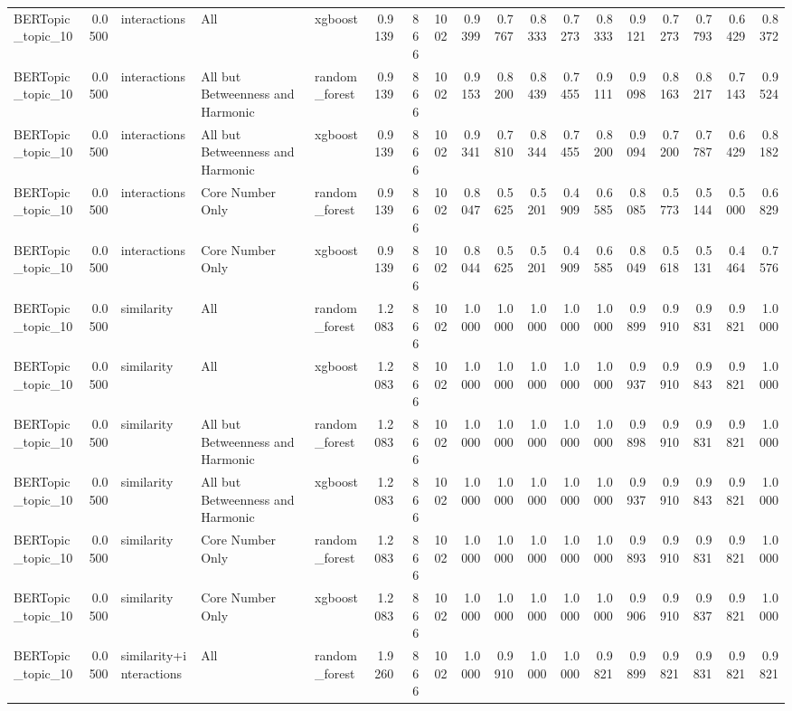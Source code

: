 \begin{tabular}{lrlllrrrrrrrrrrrrr}
BERTopic_topic_10 & 0.0500 & interactions & All & xgboost & 0.9139 & 866 & 1002 & 0.9399 & 0.7767 & 0.8333 & 0.7273 & 0.8333 & 0.9121 & 0.7273 & 0.7793 & 0.6429 & 0.8372 \\
BERTopic_topic_10 & 0.0500 & interactions & All but Betweenness and Harmonic & random_forest & 0.9139 & 866 & 1002 & 0.9153 & 0.8200 & 0.8439 & 0.7455 & 0.9111 & 0.9098 & 0.8163 & 0.8217 & 0.7143 & 0.9524 \\
BERTopic_topic_10 & 0.0500 & interactions & All but Betweenness and Harmonic & xgboost & 0.9139 & 866 & 1002 & 0.9341 & 0.7810 & 0.8344 & 0.7455 & 0.8200 & 0.9094 & 0.7200 & 0.7787 & 0.6429 & 0.8182 \\
BERTopic_topic_10 & 0.0500 & interactions & Core Number Only & random_forest & 0.9139 & 866 & 1002 & 0.8047 & 0.5625 & 0.5201 & 0.4909 & 0.6585 & 0.8085 & 0.5773 & 0.5144 & 0.5000 & 0.6829 \\
BERTopic_topic_10 & 0.0500 & interactions & Core Number Only & xgboost & 0.9139 & 866 & 1002 & 0.8044 & 0.5625 & 0.5201 & 0.4909 & 0.6585 & 0.8049 & 0.5618 & 0.5131 & 0.4464 & 0.7576 \\
BERTopic_topic_10 & 0.0500 & similarity & All & random_forest & 1.2083 & 866 & 1002 & 1.0000 & 1.0000 & 1.0000 & 1.0000 & 1.0000 & 0.9899 & 0.9910 & 0.9831 & 0.9821 & 1.0000 \\
BERTopic_topic_10 & 0.0500 & similarity & All & xgboost & 1.2083 & 866 & 1002 & 1.0000 & 1.0000 & 1.0000 & 1.0000 & 1.0000 & 0.9937 & 0.9910 & 0.9843 & 0.9821 & 1.0000 \\
BERTopic_topic_10 & 0.0500 & similarity & All but Betweenness and Harmonic & random_forest & 1.2083 & 866 & 1002 & 1.0000 & 1.0000 & 1.0000 & 1.0000 & 1.0000 & 0.9898 & 0.9910 & 0.9831 & 0.9821 & 1.0000 \\
BERTopic_topic_10 & 0.0500 & similarity & All but Betweenness and Harmonic & xgboost & 1.2083 & 866 & 1002 & 1.0000 & 1.0000 & 1.0000 & 1.0000 & 1.0000 & 0.9937 & 0.9910 & 0.9843 & 0.9821 & 1.0000 \\
BERTopic_topic_10 & 0.0500 & similarity & Core Number Only & random_forest & 1.2083 & 866 & 1002 & 1.0000 & 1.0000 & 1.0000 & 1.0000 & 1.0000 & 0.9893 & 0.9910 & 0.9831 & 0.9821 & 1.0000 \\
BERTopic_topic_10 & 0.0500 & similarity & Core Number Only & xgboost & 1.2083 & 866 & 1002 & 1.0000 & 1.0000 & 1.0000 & 1.0000 & 1.0000 & 0.9906 & 0.9910 & 0.9837 & 0.9821 & 1.0000 \\
BERTopic_topic_10 & 0.0500 & similarity+interactions & All & random_forest & 1.9260 & 866 & 1002 & 1.0000 & 0.9910 & 1.0000 & 1.0000 & 0.9821 & 0.9899 & 0.9821 & 0.9831 & 0.9821 & 0.9821 \\

\end{tabular}
